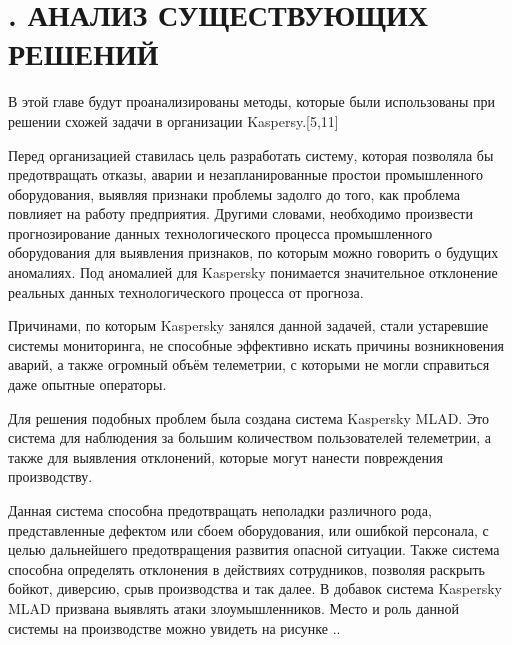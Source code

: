 \setcounter{chaptercntr}{2}

\sectionbreak \section*{
  \gostTitleFont
  \redline
  \thechaptercntr . 
  АНАЛИЗ СУЩЕСТВУЮЩИХ РЕШЕНИЙ
}

\titlespace

{\gostFont

  \par \redline В этой главе будут проанализированы методы, которые были использованы при решении схожей задачи в организации Kaspersy.[5,11]

  \par \redline	Перед организацией ставилась цель разработать систему, которая позволяла бы предотвращать отказы, аварии и незапланированные простои промышленного оборудования, выявляя признаки проблемы задолго до того, как проблема повлияет на работу предприятия. Другими словами, необходимо произвести прогнозирование данных технологического процесса промышленного оборудования для выявления признаков, по которым можно говорить о будущих аномалиях. Под аномалией для Kaspersky понимается значительное отклонение реальных данных технологического процесса от прогноза.

  \par \redline	Причинами, по которым Kaspersky занялся данной задачей, стали устаревшие системы мониторинга, не способные эффективно искать причины возникновения аварий, а также огромный объём телеметрии, с которыми не могли справиться даже опытные операторы.

  \par \redline	Для решения подобных проблем была создана система Kaspersky MLAD. Это система для наблюдения за большим количеством пользователей телеметрии, а также для выявления отклонений, которые могут нанести повреждения производству.

  \par \redline Данная система способна предотвращать неполадки различного рода, представленные дефектом или сбоем оборудования, или ошибкой персонала, с целью дальнейшего предотвращения развития опасной ситуации. Также система способна определять отклонения в действиях сотрудников, позволяя раскрыть бойкот, диверсию, срыв производства и так далее. В добавок система Kaspersky MLAD призвана выявлять атаки злоумышленников. Место и роль данной системы на производстве можно увидеть на рисунке \thechaptercntr .\theimagecntr.

}
